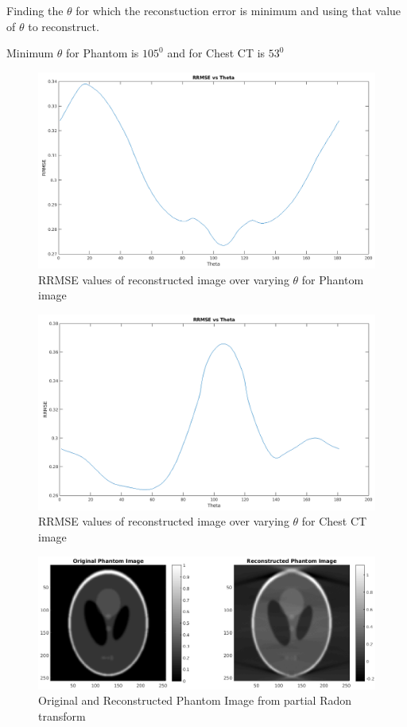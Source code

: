 \documentclass[11pt]{article}
\begin{document}
\maketitle

Finding the $\theta$ for which the reconstuction error is minimum and using that value of  $\theta$ to reconstruct.

Minimum $\theta$ for Phantom is $105^{0}$ and for Chest CT is $53^{0}$ 

\begin{figure}[h]
\centering
\includegraphics[scale=0.4]{phantom-plot}
\caption{RRMSE values of reconstructed image over varying $\theta$ for Phantom image}
\end{figure}
\begin{figure}[h]
\centering
\includegraphics[scale=0.4]{CT-chest-plot}
\caption{RRMSE values of reconstructed image over varying $\theta$ for Chest CT image}
\end{figure}


\begin{figure}[h]
\centering
\includegraphics[scale=0.4]{phantom-recons}
\caption{Original and Reconstructed Phantom Image from partial Radon transform}
\end{figure}
\end{document}
